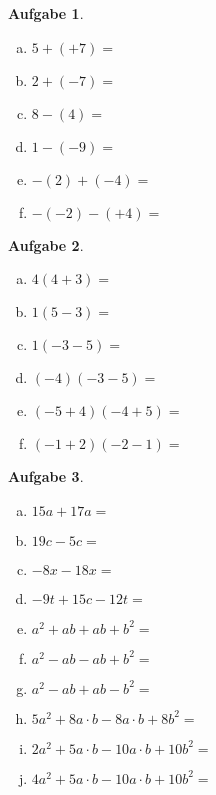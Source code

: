 \documentclass[12pt,fleqn]{article}
\theoremstyle{aufg}
\newtheorem{aufgabe}{Aufgabe}
\theoremstyle{bsp}
\begin{document}
 
    \begin{flushleft}
\begin{aufgabe} ~ \\ 
\begin{multicols}{3} 
\begin{enumerate}[a)] 
\item 
$5+(+7)=$
\item 
$2+(-7)=$
\item 
$8-(4)=$
\item 
$1-(-9)=$
\item 
$-(2)+(-4)=$
\item 
$-(-2)-(+4)=$
\end{enumerate} 
\end{multicols} 
\end{aufgabe} 
\begin{aufgabe} ~ \\ 
\begin{multicols}{3} 
\begin{enumerate}[a)] 
\item 
$4(4+3)=$
\item 
$1(5-3)=$
\item 
$1(-3-5)=$
\item 
$(-4)(-3-5)=$
\item 
$(-5+4)(-4+5)=$
\item 
$(-1+2)(-2-1)=$
\end{enumerate} 
\end{multicols} 
\end{aufgabe} 
\begin{aufgabe} ~ \\ 
\begin{multicols}{2} 
\begin{enumerate}[a)] 
\item 
$15a+17a=$
\item 
$19c-5c=$
\item 
$-8x-18x=$
\item 
$-9t+15c-12t=$
\item 
$a^2+ab+ab+b^2=$
\item 
$a^2-ab-ab+b^2=$
\item 
$a^2-ab+ab-b^2=$
\item 
$5a^2+8a\cdot b-8a\cdot b+8b^2=$
\item 
$2a^2+5a\cdot b-10a\cdot b+10b^2=$
\item 
$4a^2+5a\cdot b-10a\cdot b+10b^2=$
\end{enumerate} 
\end{multicols} 
\end{aufgabe} 

\end{flushleft}
\end{document}
